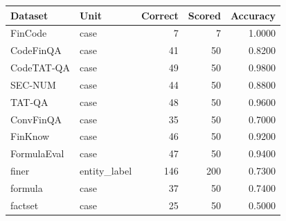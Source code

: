 \begin{tabular}{llrrr}
\toprule
Dataset & Unit & Correct & Scored & Accuracy \\
\midrule
FinCode & case & 7 & 7 & 1.0000 \\
CodeFinQA & case & 41 & 50 & 0.8200 \\
CodeTAT-QA & case & 49 & 50 & 0.9800 \\
SEC-NUM & case & 44 & 50 & 0.8800 \\
TAT-QA & case & 48 & 50 & 0.9600 \\
ConvFinQA & case & 35 & 50 & 0.7000 \\
FinKnow & case & 46 & 50 & 0.9200 \\
FormulaEval & case & 47 & 50 & 0.9400 \\
finer & entity_label & 146 & 200 & 0.7300 \\
formula & case & 37 & 50 & 0.7400 \\
factset & case & 25 & 50 & 0.5000 \\
\bottomrule
\end{tabular}
